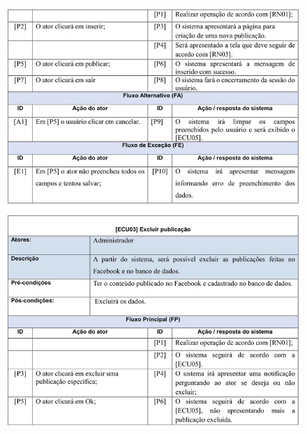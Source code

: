 \begin{figure}
    \includegraphics[width=\textwidth]{documentacao/ModeloArtefatos-07.jpg}
\end{figure}

